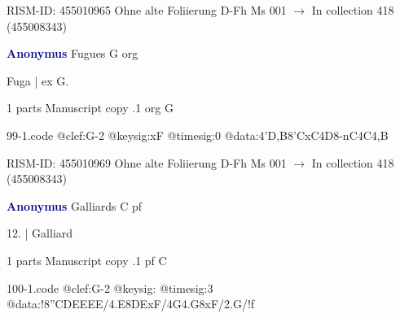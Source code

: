 \documentclass[twocolumn]{book}
\begin{document}
\newline RISM-ID: 455010965
\newline Ohne alte Foliierung
\newline D-Fh  Ms 001
\newline $\rightarrow$ In collection 418 (455008343)

\newline \par \vspace{7pt} \textcolor{darkblue}{\textbf{Anonymus  }}
\newline Fugues  G  
\newline org
\newline \begin{itshape}[f.88v, at left:] Fuga | ex G.\end{itshape} 
\newline \textcolor{darkblue}{}  1 parts  
\newline Manuscript copy
.1  org  G  
\begin{filecontents*}{99-1.code}
@clef:G-2
@keysig:xF
@timesig:0
@data:4'D,B{8'CxC}4D8-nC4C4,B
\end{filecontents*}
\newline
%

\newline RISM-ID: 455010969
\newline Ohne alte Foliierung
\newline D-Fh  Ms 001
\newline $\rightarrow$ In collection 418 (455008343)

\newline \par \vspace{7pt} \textcolor{darkblue}{\textbf{Anonymus  }}
\newline Galliards  C  
\newline pf
\newline \begin{itshape}[f.8r, at left:] 12. | Galliard\end{itshape} 
\newline \textcolor{darkblue}{}  1 parts  
\newline Manuscript copy
.1  pf  C  
\begin{filecontents*}{100-1.code}
@clef:G-2
@keysig:
@timesig:3
@data:!{8''CDEEEE}/4.E{8DExF}/4G4.G8xF/2.G/!f
\end{filecontents*}
\newline
%
\end{document}
